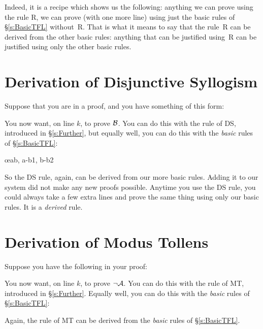 Indeed, it is a recipe which shows us the following: anything we can prove using the rule R, we can prove (with one more line) using just the basic rules of \S\ref{s:BasicTFL} without~R. That is what it means to say that the rule~R can be derived from the other basic rules: anything that can be justified using~R can be justified using only the other basic rules.


\section{Derivation of Disjunctive Syllogism}
Suppose that you are in a proof, and you have something of this form:
\begin{fitchproof}
\end{fitchproof}
You now want, on line $k$, to prove $\mathcal{B}$. You can do this with the rule of DS, introduced in \S\ref{s:Further}, but equally well, you can do this with the \emph{basic} rules of \S\ref{s:BasicTFL}:
	\begin{fitchproof}
		\open
		\close
		\open
		\close
	\oe{ab, a-b1, b-b2}
\end{fitchproof}
So the DS rule, again, can be derived from our more basic rules. Adding it to our system did not make any new proofs possible. Anytime you use the DS rule, you could always take a few extra lines and prove the same thing using only our basic rules. It is a \emph{derived} rule.

\section{Derivation of Modus Tollens}
Suppose you have the following in your proof:
\begin{fitchproof}
\end{fitchproof}
You now want, on line $k$, to prove $\neg \mathcal{A}$. You can do this with the rule of MT, introduced in \S\ref{s:Further}. Equally well, you can do this with the \emph{basic} rules of \S\ref{s:BasicTFL}:
\begin{fitchproof}
		\open
		\close
\end{fitchproof}
Again, the rule of MT can be derived from the \emph{basic} rules of \S\ref{s:BasicTFL}.

